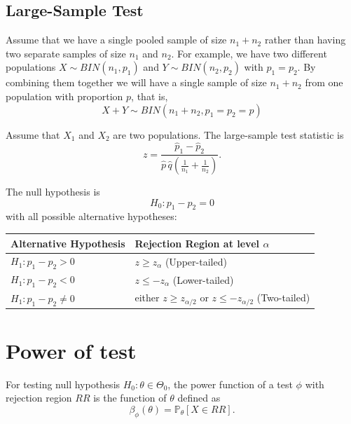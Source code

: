 \subsection{Large-Sample Test}

Assume that we have a single pooled sample of size $n_1 + n_2$ rather than having two separate samples of size $n_1$ and $n_2$.
For example, we have two different populations $X \sim BIN(n_1, p_1)$ and $Y \sim BIN(n_2, p_2)$ with $p_1 = p_2$. By combining them together 
we will have a single sample of size $n_1 + n_2$ from one population with proportion $p$, that is,
\[
    X + Y \sim BIN(n_1 + n_2, p_1 = p_2 = p)
\]

\begin{definition}
    Assume that $X_1$ and $X_2$ are two populations. The large-sample test statistic is
    \begin{equation}
        z = \frac{\widehat{p}_1 - \widehat{p}_2}{\displaystyle \widehat{p}\, \widehat{q} \left(\frac{1}{n_1} + \frac{1}{n_2} \right)}.
    \end{equation}

    The null hypothesis is
    \[
        H_0 : p_1 - p_2 = 0
    \]
    with all possible alternative hypotheses:

    \renewcommand{\arraystretch}{1.2}
    \begin{tabularx}{\textwidth}{|l|X|}
    \hline
    Alternative Hypothesis & Rejection Region at level $\alpha$\\
    \hline
    $H_1 :  p_1 - p_2 > 0$ & $z \geq z_\alpha$ (Upper-tailed)\\
    \hline
    $H_1 :  p_1 - p_2 < 0$ & $z \leq -z_\alpha$ (Lower-tailed)\\
    \hline
    $H_1 :  p_1 - p_2 \neq 0$ & either $z \geq z_{\alpha/2}$ or $z \leq -z_{\alpha/2}$ (Two-tailed)\\
    \hline
    \end{tabularx}
\end{definition}

\section{Power of test}

\begin{definition}
    For testing null hypothesis $H_0 : \theta \in \Theta_0$, the power function 
    of a test $\phi$ with rejection region $RR$ is the function of $\theta$ defined as 
    \begin{equation}
        \beta_\phi(\theta) = \mathbb{P}_\theta[X \in RR].
    \end{equation}
\end{definition}

